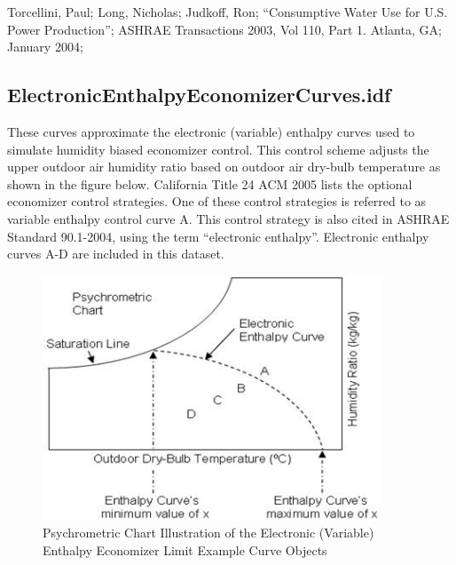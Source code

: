 Torcellini, Paul; Long, Nicholas; Judkoff, Ron; ``Consumptive Water Use for U.S. Power Production''; ASHRAE Transactions 2003, Vol 110, Part 1. Atlanta, GA; January 2004;

\subsection{ElectronicEnthalpyEconomizerCurves.idf}\label{electronicenthalpyeconomizercurves.idf}

These curves approximate the electronic (variable) enthalpy curves used to simulate humidity biased economizer control. This control scheme adjusts the upper outdoor air humidity ratio based on outdoor air dry-bulb temperature as shown in the figure below. California Title 24 ACM 2005 lists the optional economizer control strategies. One of these control strategies is referred to as variable enthalpy control curve A. This control strategy is also cited in ASHRAE Standard 90.1-2004, using the term ``electronic enthalpy''. Electronic enthalpy curves A-D are included in this dataset.

\begin{figure}[hbtp] %
\centering
\includegraphics[width=0.9\textwidth, height=0.9\textheight, keepaspectratio=true]{media/image027.jpg}
\caption{Psychrometric Chart Illustration of the Electronic (Variable) Enthalpy Economizer Limit Example Curve Objects \protect \label{fig:psychrometric-chart-illustration-of}}
\end{figure}


